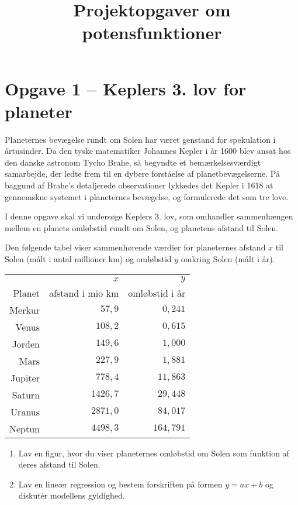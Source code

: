 \documentclass[12pt,oneside,a4paper]{article}
\title{Projektopgaver om potensfunktioner}
\date{\vspace{-5ex}}
\theoremstyle{plain}
\begin{document}
\maketitle

\section*{Opgave 1 -- Keplers 3. lov for planeter}
Planeternes bevægelse rundt om Solen har været genstand for spekulation i
årtusinder.  Da den tyske matematiker Johannes Kepler i år 1600 blev ansat hos
den danske astronom Tycho Brahe, så begyndte et bemærkelsesværdigt samarbejde,
der ledte frem til en dybere forståelse af planetbevægelserne. På baggund af
Brahe's detaljerede observationer lykkedes det Kepler i 1618 at gennemskue
systemet i planeternes bevægelse, og formulerede det som tre love.

I denne opgave skal vi undersøge Keplers 3. lov, som omhandler sammenhængen
mellem en planets omløbstid rundt om Solen, og planetens afstand til Solen.

Den følgende tabel viser sammenhørende værdier for planeternes afstand $x$ til
Solen (målt i antal millioner km) og omløbstid $y$ omkring Solen (målt i år).

\vspace{2ex}

\begin{center}
\begin{tabular}{r|r|r}
    \hline
            & $x$                 & $y$ \\
    Planet  & afstand i mio km    & omløbstid i år   \\
    \hline 
    Merkur  &  $  57,9$ &   $0,241$ \\
    Venus   &  $ 108,2$ &   $0,615$ \\
    Jorden  &  $ 149,6$ &   $1,000$ \\
    Mars    &  $ 227,9$ &   $1,881$ \\
    Jupiter &  $ 778,4$ &  $11,863$ \\
    Saturn  &  $1426,7$ &  $29,448$ \\
    Uranus  &  $2871,0$ &  $84,017$ \\
    Neptun  &  $4498,3$ & $164,791$ \\
    \hline 
\end{tabular}
\end{center}

\begin{enumerate}[label=(\alph*)]
    \item Lav en figur, hvor du viser planeternes omløbstid om Solen som
        funktion af deres afstand til Solen.
    \item Lav en lineær regression og bestem forskriften på formen $y=ax+b$ og
        diskutér modellens gyldighed.
\end{enumerate}
\end{document}
